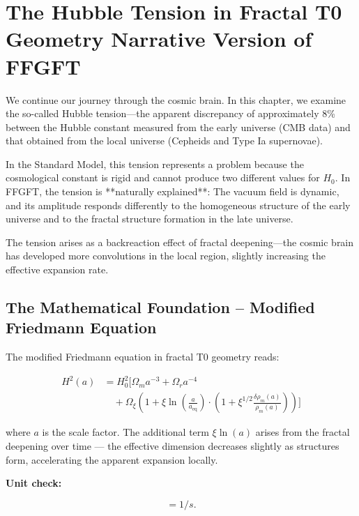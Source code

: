 \chapter{The Hubble Tension in Fractal T0 Geometry  Narrative Version of FFGFT}


	
	We continue our journey through the cosmic brain. In this chapter, we examine the so-called Hubble tension—the apparent discrepancy of approximately 8\% between the Hubble constant measured from the early universe (CMB data) and that obtained from the local universe (Cepheids and Type Ia supernovae).
	
	In the Standard Model, this tension represents a problem because the cosmological constant is rigid and cannot produce two different values for $H_0$. In FFGFT, the tension is **naturally explained**: The vacuum field is dynamic, and its amplitude responds differently to the homogeneous structure of the early universe and to the fractal structure formation in the late universe.
	
	The tension arises as a backreaction effect of fractal deepening—the cosmic brain has developed more convolutions in the local region, slightly increasing the effective expansion rate.
	
	\section*{The Mathematical Foundation – Modified Friedmann Equation}
	
	The modified Friedmann equation in fractal T0 geometry reads:
	
	\begin{equation}
		\begin{aligned}
			H^2(a) &= H_0^2 \Biggl[ \Omega_m a^{-3} + \Omega_r a^{-4} \\
			&\quad + \Omega_\xi \left(1 + \xi \ln\left(\frac{a}{a_{\text{eq}}}\right) 
			\cdot \left(1 + \xi^{1/2} \frac{\delta \rho_m(a)}{\rho_m(a)}\right) \right) \Biggr]
		\end{aligned}
	\end{equation}
	
	where $a$ is the scale factor. The additional term $\xi \ln(a)$ arises from the fractal deepening over time — the effective dimension decreases slightly as structures form, accelerating the apparent expansion locally.
	
	\textbf{Unit check:}
	
	\begin{equation}
		[H(a)] = \si{1/s}.
	\end{equation}
	
